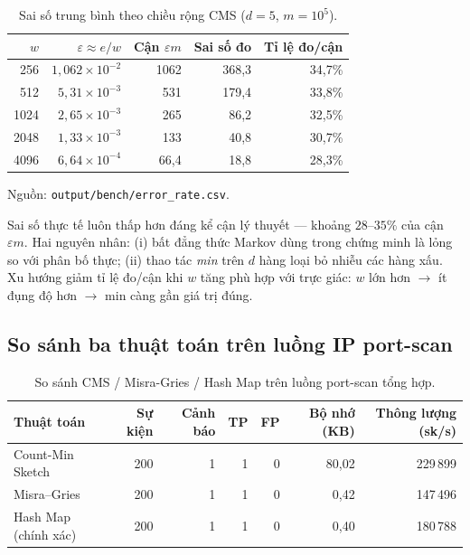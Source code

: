 \begin{table}[H]
  \centering
  \caption{Sai số trung bình theo chiều rộng CMS ($d = 5$, $m = 10^5$).}
  \label{tab:error-rate}
  \begin{tabular}{@{}r r r r r@{}}
    \toprule
    \textbf{$w$} & \textbf{$\varepsilon \approx e/w$} & \textbf{Cận $\varepsilon m$} & \textbf{Sai số đo} & \textbf{Tỉ lệ đo/cận} \\
    \midrule
    256  & $1{,}062 \times 10^{-2}$ & 1062 & 368{,}3 & 34{,}7\% \\
    512  & $5{,}31 \times 10^{-3}$  & 531  & 179{,}4 & 33{,}8\% \\
    1024 & $2{,}65 \times 10^{-3}$  & 265  & 86{,}2  & 32{,}5\% \\
    2048 & $1{,}33 \times 10^{-3}$  & 133  & 40{,}8  & 30{,}7\% \\
    4096 & $6{,}64 \times 10^{-4}$  & 66{,}4 & 18{,}8 & 28{,}3\% \\
    \bottomrule
  \end{tabular}
\end{table}

\noindent Nguồn: \texttt{output/bench/error\_rate.csv}.

Sai số thực tế luôn thấp hơn đáng kể cận lý thuyết --- khoảng $28$--$35\%$ của cận $\varepsilon m$. Hai nguyên nhân: (i) bất đẳng thức Markov dùng trong chứng minh là lỏng so với phân bố thực; (ii) thao tác \textit{min} trên $d$ hàng loại bỏ nhiễu các hàng xấu. Xu hướng giảm tỉ lệ đo/cận khi $w$ tăng phù hợp với trực giác: $w$ lớn hơn $\rightarrow$ ít đụng độ hơn $\rightarrow$ min càng gần giá trị đúng.

\subsection{So sánh ba thuật toán trên luồng IP port-scan}
\label{sec:portscan-eval}

\begin{table}[H]
  \centering
  \caption{So sánh CMS / Misra-Gries / Hash Map trên luồng port-scan tổng hợp.}
  \label{tab:portscan-comparison}
  \small
  \begin{tabular}{@{}l r r r r r r@{}}
    \toprule
    \textbf{Thuật toán} & \textbf{Sự kiện} & \textbf{Cảnh báo} & \textbf{TP} & \textbf{FP} & \textbf{Bộ nhớ (KB)} & \textbf{Thông lượng (sk/s)} \\
    \midrule
    Count-Min Sketch    & 200 & 1 & 1 & 0 & 80{,}02 & 229\,899 \\
    Misra--Gries        & 200 & 1 & 1 & 0 & 0{,}42  & 147\,496 \\
    Hash Map (chính xác)& 200 & 1 & 1 & 0 & 0{,}40  & 180\,788 \\
    \bottomrule
  \end{tabular}
\end{table}

